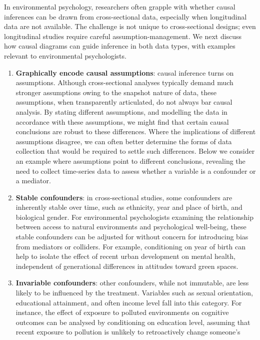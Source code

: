 \documentclass[
  singlecolumn]{article}
\begin{document}
In environmental psychology, researchers often grapple with whether
causal inferences can be drawn from cross-sectional data, especially
when longitudinal data are not available. The challenge is not unique to
cross-sectional designs; even longitudinal studies require careful
assumption-management. We next discuss how causal diagrams can guide
inference in both data types, with examples relevant to environmental
psychologists.

\begin{enumerate}
\def\labelenumi{\arabic{enumi}.}
\item
  \textbf{Graphically encode causal assumptions}: causal inference turns
  on assumptions. Although cross-sectional analyses typically demand
  much stronger assumptions owing to the snapshot nature of data, these
  assumptions, when transparently articulated, do not always bar causal
  analysis. By stating different assumptions, and modelling the data in
  accordance with these assumptions, we might find that certain causal
  conclusions are robust to these differences. Where the implications of
  different assumptions disagree, we can often better determine the
  forms of data collection that would be required to settle such
  differences. Below we consider an example where assumptions point to
  different conclusions, revealing the need to collect time-series data
  to assess whether a variable is a confounder or a mediator.
\item
  \textbf{Stable confounders}: in cross-sectional studies, some
  confounders are inherently stable over time, such as ethnicity, year
  and place of birth, and biological gender. For environmental
  psychologists examining the relationship between access to natural
  environments and psychological well-being, these stable confounders
  can be adjusted for without concern for introducing bias from
  mediators or colliders. For example, conditioning on year of birth can
  help to isolate the effect of recent urban development on mental
  health, independent of generational differences in attitudes toward
  green spaces.
\item
  \textbf{Invariable confounders}: other confounders, while not
  immutable, are less likely to be influenced by the treatment.
  Variables such as sexual orientation, educational attainment, and
  often income level fall into this category. For instance, the effect
  of exposure to polluted environments on cognitive outcomes can be
  analysed by conditioning on education level, assuming that recent
  exposure to pollution is unlikely to retroactively change someone's

\end{enumerate}
\end{document}
